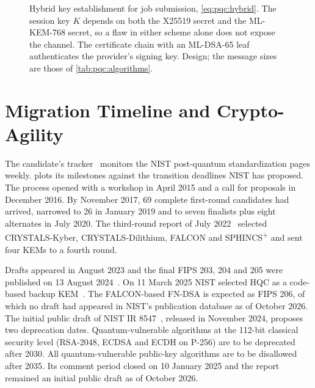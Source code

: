 \begin{figure}[htbp]
\caption{Hybrid key establishment for job submission, \cref{eq:pqc:hybrid}. The session key $K$ depends on both the X25519 secret and the ML-KEM-768 secret, so a flaw in either scheme alone does not expose the channel. The certificate chain with an ML-DSA-65 leaf authenticates the provider's signing key. Design; the message sizes are those of \cref{tab:pqc:algorithms}.}
\label{fig:pqc:hybrid}
\end{figure}

\section{Migration Timeline and Crypto-Agility}\label{sec:pqc:timeline}

The candidate's tracker~\cite{guo2026nisttracker} monitors the NIST post-quantum standardization pages weekly.  plots its milestones against the transition deadlines NIST has proposed. The process opened with a workshop in April 2015 and a call for proposals in December 2016. By November 2017, 69 complete first-round candidates had arrived, narrowed to 26 in January 2019 and to seven finalists plus eight alternates in July 2020. The third-round report of July 2022~\cite{nist2022ir8413} selected CRYSTALS-Kyber, CRYSTALS-Dilithium, FALCON and SPHINCS\textsuperscript{+} and sent four KEMs to a fourth round.

Drafts appeared in August 2023 and the final FIPS 203, 204 and 205 were published on 13 August 2024~\cite{nist2024fips203,nist2024fips204,nist2024fips205}. On 11 March 2025 NIST selected HQC as a code-based backup KEM~\cite{nist2025ir8545}. The FALCON-based FN-DSA is expected as FIPS 206, of which no draft had appeared in NIST's publication database as of October 2026. The initial public draft of NIST IR 8547~\cite{nist2024ir8547}, released in November 2024, proposes two deprecation dates. Quantum-vulnerable algorithms at the 112-bit classical security level (RSA-2048, ECDSA and ECDH on P-256) are to be deprecated after 2030. All quantum-vulnerable public-key algorithms are to be disallowed after 2035. Its comment period closed on 10 January 2025 and the report remained an initial public draft as of October 2026.

